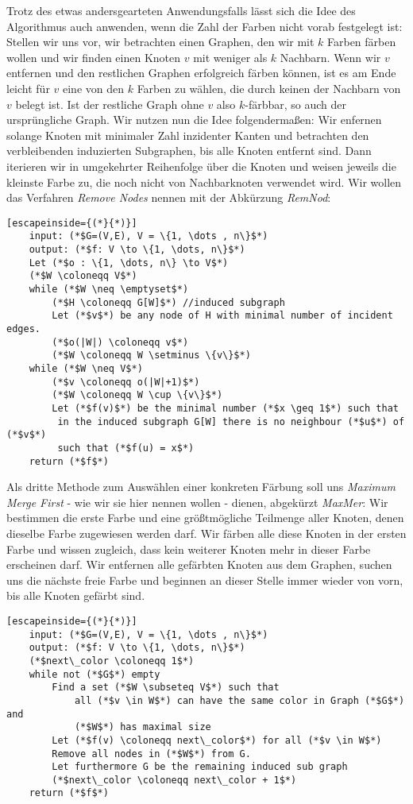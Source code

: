 \documentclass[a4paper]{article}
\theoremstyle{nonumberplain}
\begin{document}
Trotz des etwas andersgearteten Anwendungsfalls lässt sich die Idee des Algorithmus auch anwenden, wenn die Zahl der Farben nicht vorab festgelegt ist: Stellen wir uns vor, wir betrachten einen Graphen, den wir mit $k$ Farben färben wollen und wir finden einen Knoten $v$ mit weniger als $k$ Nachbarn. Wenn wir $v$ entfernen und den restlichen Graphen erfolgreich färben können, ist es am Ende leicht für $v$ eine von den $k$ Farben zu wählen, die durch keinen der Nachbarn von $v$ belegt ist. Ist der restliche Graph ohne $v$ also $k$-färbbar, so auch der ursprüngliche Graph. Wir nutzen nun die Idee folgendermaßen: Wir enfernen solange Knoten mit minimaler Zahl inzidenter Kanten und betrachten den verbleibenden induzierten Subgraphen, bis alle Knoten entfernt sind. Dann iterieren wir in umgekehrter Reihenfolge über die Knoten und weisen jeweils die kleinste Farbe zu, die noch nicht von Nachbarknoten verwendet wird. Wir wollen das Verfahren \textit{Remove Nodes} nennen mit der Abkürzung \textit{RemNod}:
{
	\small
	\begin{lstlisting}[escapeinside={(*}{*)}]
	input: (*$G=(V,E), V = \{1, \dots , n\}$*)
	output: (*$f: V \to \{1, \dots, n\}$*)
	Let (*$o : \{1, \dots, n\} \to V$*)
	(*$W \coloneqq V$*)
	while (*$W \neq \emptyset$*)
		(*$H \coloneqq G[W]$*) //induced subgraph
		Let (*$v$*) be any node of H with minimal number of incident edges.
		(*$o(|W|) \coloneqq v$*)
		(*$W \coloneqq W \setminus \{v\}$*)
	while (*$W \neq V$*)
		(*$v \coloneqq o(|W|+1)$*)
		(*$W \coloneqq W \cup \{v\}$*)
		Let (*$f(v)$*) be the minimal number (*$x \geq 1$*) such that
		 in the induced subgraph G[W] there is no neighbour (*$u$*) of (*$v$*)
		 such that (*$f(u) = x$*)
	return (*$f$*)
	\end{lstlisting}
}

Als dritte Methode zum Auswählen einer konkreten Färbung soll uns \textit{Maximum Merge First} - wie wir sie hier nennen wollen - dienen, abgekürzt \textit{MaxMer}:
Wir bestimmen die erste Farbe und eine größtmögliche Teilmenge aller Knoten, denen dieselbe Farbe zugewiesen werden darf. Wir färben alle diese Knoten in der ersten Farbe und wissen zugleich, dass kein weiterer Knoten mehr in dieser Farbe erscheinen darf. Wir entfernen alle gefärbten Knoten aus dem Graphen, suchen uns die nächste freie Farbe und beginnen an dieser Stelle immer wieder von vorn, bis alle Knoten gefärbt sind.
{
	\small
	\begin{lstlisting}[escapeinside={(*}{*)}]
	input: (*$G=(V,E), V = \{1, \dots , n\}$*)
	output: (*$f: V \to \{1, \dots, n\}$*)
	(*$next\_color \coloneqq 1$*)
	while not (*$G$*) empty
		Find a set (*$W \subseteq V$*) such that
			all (*$v \in W$*) can have the same color in Graph (*$G$*) and
			(*$W$*) has maximal size
		Let (*$f(v) \coloneqq next\_color$*) for all (*$v \in W$*)
		Remove all nodes in (*$W$*) from G.
		Let furthermore G be the remaining induced sub graph
		(*$next\_color \coloneqq next\_color + 1$*)
	return (*$f$*)
	\end{lstlisting}
}
\end{document}
